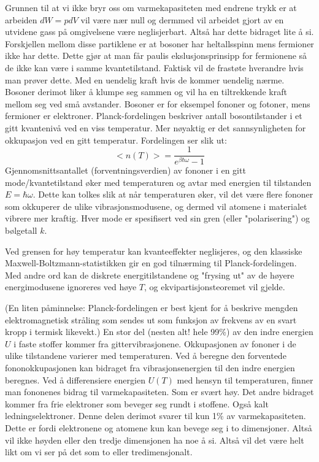 \documentclass{article}
\begin{document}
Grunnen til at vi ikke bryr oss om varmekapasiteten med endrene trykk er at arbeiden $dW = pdV$ vil være nær null og dermmed vil arbeidet gjort av en utvidene gass på omgivelsene være neglisjerbart. Altså har dette bidraget lite å si.
Forskjellen mellom disse partiklene er at bosoner har heltallsspinn mens fermioner ikke har dette. Dette gjør at man får paulis ekslusjonsprinsipp for fermionene så de ikke kan være i samme kvantetilstand. Faktisk vil de frastøte hverandre hvis man prøver dette. Med en uendelig kraft hvis de kommer uendelig nærme. Bosoner derimot liker å klumpe seg sammen og vil ha en tiltrekkende kraft mellom seg ved små avstander. Bosoner er for eksempel fononer og fotoner, mens fermioner er elektroner.
Planck-fordelingen beskriver antall bosontilstander i et gitt kvantenivå ved en viss temperatur. Mer nøyaktig er det sannsynligheten for okkupasjon ved en gitt temperatur. Fordelingen ser slik ut:
\begin{equation}
    <n(T)> = \frac{1}{e^{\beta \hbar \omega}-1}
\end{equation}
Gjennomsnittsantallet (forventningsverdien) av fononer i en gitt mode/kvantetilstand øker med temperaturen og avtar med energien til tilstanden $ E = \hbar \omega $. Dette kan tolkes slik at når temperaturen øker, vil det være flere fononer som okkuperer de ulike vibrasjonsmodusene, og dermed vil atomene i materialet vibrere mer kraftig. Hver mode er spesifisert ved sin gren (eller "polarisering") og bølgetall $k$.

Ved grensen for høy temperatur kan kvanteeffekter neglisjeres, og den klassiske Maxwell-Boltzmann-statistikken gir en god tilnærming til Planck-fordelingen. Med andre ord kan de diskrete energitilstandene og "frysing ut" av de høyere energimodusene ignoreres ved høye $T$, og ekvipartisjonsteoremet vil gjelde.

(En liten påminnelse: Planck-fordelingen er best kjent for å beskrive mengden elektromagnetisk stråling som sendes ut som funksjon av frekvens av en svart kropp i termisk likevekt.)
En stor del (nesten alt! hele 99\%) av den indre energien $U$ i faste stoffer kommer fra gittervibrasjonene. Okkupasjonen av fononer i de ulike tilstandene varierer med temperaturen. Ved å beregne den forventede fononokkupasjonen kan bidraget fra vibrasjonsenergien til den indre energien beregnes. Ved å differensiere energien $U(T)$ med hensyn til temperaturen, finner man fononenes bidrag til varmekapasiteten. Som er svært høy. Det andre bidraget kommer fra frie elektroner som  beveger seg rundt i stoffene. Også kalt ledningselektroner. Denne delen derimot svarer til kun 1\% av varmekapasiteten.
Dette er fordi elektronene og atomene kun kan bevege seg i to dimensjoner. Altså vil ikke høyden eller den tredje dimensjonen ha noe å si. Altså vil det være helt likt om vi ser på det som to eller tredimensjonalt.
\end{document}
